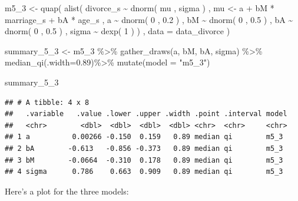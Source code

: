 \documentclass[
]{book}
\newenvironment{Shaded}{\begin{snugshade}}{\end{snugshade}}
\newcommand{\AttributeTok}[1]{\textcolor[rgb]{0.77,0.63,0.00}{#1}}
\newcommand{\DecValTok}[1]{\textcolor[rgb]{0.00,0.00,0.81}{#1}}
\newcommand{\FloatTok}[1]{\textcolor[rgb]{0.00,0.00,0.81}{#1}}
\newcommand{\FunctionTok}[1]{\textcolor[rgb]{0.00,0.00,0.00}{#1}}
\newcommand{\NormalTok}[1]{#1}
\newcommand{\OtherTok}[1]{\textcolor[rgb]{0.56,0.35,0.01}{#1}}
\newcommand{\SpecialCharTok}[1]{\textcolor[rgb]{0.00,0.00,0.00}{#1}}
\newcommand{\StringTok}[1]{\textcolor[rgb]{0.31,0.60,0.02}{#1}}
\begin{document}
\begin{Shaded}
\begin{Highlighting}[]
\NormalTok{m5\_3 }\OtherTok{\textless{}{-}} \FunctionTok{quap}\NormalTok{( }
  \FunctionTok{alist}\NormalTok{( }
\NormalTok{    divorce\_s }\SpecialCharTok{\textasciitilde{}} \FunctionTok{dnorm}\NormalTok{( mu , sigma ) , }
\NormalTok{    mu }\OtherTok{\textless{}{-}}\NormalTok{ a }\SpecialCharTok{+}\NormalTok{ bM }\SpecialCharTok{*}\NormalTok{ marriage\_s }\SpecialCharTok{+}\NormalTok{ bA }\SpecialCharTok{*}\NormalTok{ age\_s , }
\NormalTok{    a }\SpecialCharTok{\textasciitilde{}} \FunctionTok{dnorm}\NormalTok{( }\DecValTok{0}\NormalTok{ , }\FloatTok{0.2}\NormalTok{ ) , }
\NormalTok{    bM }\SpecialCharTok{\textasciitilde{}} \FunctionTok{dnorm}\NormalTok{( }\DecValTok{0}\NormalTok{ , }\FloatTok{0.5}\NormalTok{ ) ,}
\NormalTok{    bA }\SpecialCharTok{\textasciitilde{}} \FunctionTok{dnorm}\NormalTok{( }\DecValTok{0}\NormalTok{ , }\FloatTok{0.5}\NormalTok{ ) , }
\NormalTok{    sigma }\SpecialCharTok{\textasciitilde{}} \FunctionTok{dexp}\NormalTok{( }\DecValTok{1}\NormalTok{ )}
\NormalTok{) , }\AttributeTok{data =}\NormalTok{ data\_divorce )}

\NormalTok{summary\_5\_3 }\OtherTok{\textless{}{-}}\NormalTok{ m5\_3 }\SpecialCharTok{\%\textgreater{}\%}
  \FunctionTok{gather\_draws}\NormalTok{(a, bM, bA, sigma) }\SpecialCharTok{\%\textgreater{}\%}
  \FunctionTok{median\_qi}\NormalTok{(}\AttributeTok{.width=}\FloatTok{0.89}\NormalTok{)}\SpecialCharTok{\%\textgreater{}\%}
  \FunctionTok{mutate}\NormalTok{(}\AttributeTok{model =} \StringTok{"m5\_3"}\NormalTok{)}

\NormalTok{summary\_5\_3}
\end{Highlighting}
\end{Shaded}

\begin{verbatim}
## # A tibble: 4 x 8
##   .variable   .value .lower .upper .width .point .interval model
##   <chr>        <dbl>  <dbl>  <dbl>  <dbl> <chr>  <chr>     <chr>
## 1 a          0.00266 -0.150  0.159   0.89 median qi        m5_3 
## 2 bA        -0.613   -0.856 -0.373   0.89 median qi        m5_3 
## 3 bM        -0.0664  -0.310  0.178   0.89 median qi        m5_3 
## 4 sigma      0.786    0.663  0.909   0.89 median qi        m5_3
\end{verbatim}

Here's a plot for the three models:
\end{document}
